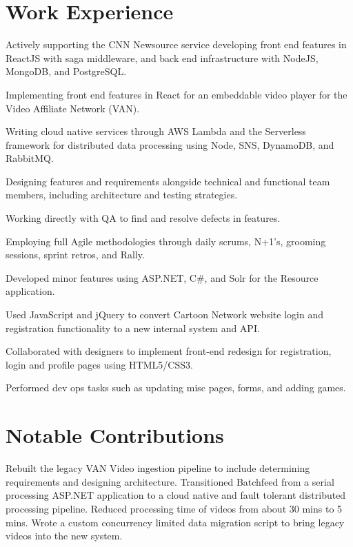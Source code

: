 \documentclass[]{deedy-resume-openfont}
\begin{document}
\begin{minipage}[t]{0.66\textwidth}
\section{Work Experience}
\vspace{\topsep} %
\begin{tightemize}
\item Actively supporting the CNN Newsource service developing front end features in ReactJS with saga middleware, and back end infrastructure with NodeJS, MongoDB, and PostgreSQL. 
\item Implementing front end features in React for an embeddable video player for the Video Affiliate Network (VAN).
\item Writing cloud native services through AWS Lambda and the Serverless framework for distributed data processing using Node, SNS, DynamoDB, and RabbitMQ.
\item Designing features and requirements alongside technical and functional team members, including architecture and testing strategies.
\item Working directly with QA to find and resolve defects in features.
\item Employing full Agile methodologies through daily scrums, N+1's, grooming sessions, sprint retros, and Rally.
\item Developed minor features using ASP.NET, C\#, and Solr for the Resource application.
\end{tightemize}
\sectionsep

\begin{tightemize}
\item Used JavaScript and jQuery to convert Cartoon Network website login and registration functionality to a new internal system and API.
\item Collaborated with designers to implement front-end redesign for registration, login and profile pages using HTML5/CSS3.
\item Performed dev ops tasks such as updating misc pages, forms, and adding games.
\end{tightemize}
\sectionsep

\section{Notable Contributions}
Rebuilt the legacy VAN Video ingestion pipeline to include determining requirements and designing architecture. Transitioned Batchfeed from a serial processing ASP.NET application to a cloud native and fault tolerant distributed processing pipeline. Reduced processing time of videos from about 30 mins to 5 mins. Wrote a custom concurrency limited data migration script to bring legacy videos into the new system.
\sectionsep


\end{minipage}
\end{document}

